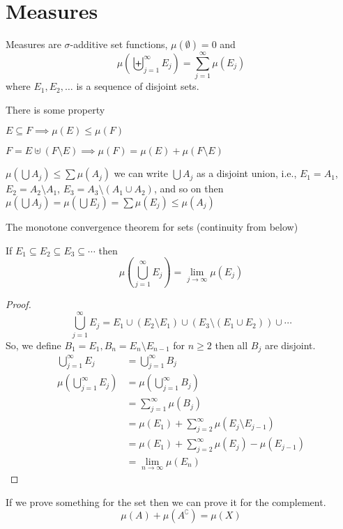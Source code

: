 \section{Measures}

\begin{definition}
Measures are $\sigma$-additive set functions, $\mu(\emptyset) = 0$ and
\[\mu\left(\biguplus_{j=1}^\infty E_j\right) = \sum_{j=1}^\infty \mu(E_j)\]
where $E_1, E_2, \dotsc$ is a sequence of disjoint sets.
\end{definition}

\begin{remark}
There is some property   

$E \subseteq F \implies \mu(E) \leq \mu(F)$ 

$F = E \uplus (F \setminus E) \implies \mu(F) = \mu(E) + \mu(F \setminus E)$

$\mu(\bigcup A_j) \leq \sum \mu(A_j)$
we can write $\bigcup A_j$ as a disjoint union, i.e.,
$E_1 = A_1$, $E_2 = A_2 \setminus A_1$, $E_3 = A_3 \setminus (A_1 \cup A_2)$, and so on then
$\mu(\bigcup A_j) = \mu(\bigcup E_j) = \sum \mu(E_j) \leq \mu(A_j)$
\end{remark}

The monotone convergence theorem for sets (continuity from below)

\begin{theorem}\label{lem:continuity-from-below}
  
If $E_1 \subseteq E_2 \subseteq E_3 \subseteq \dotsm$ then
\[\mu\left(\bigcup_{j=1}^\infty E_j\right) = \lim_{j\to\infty} \mu(E_j)\]
\end{theorem}

\begin{proof}
$$\bigcup_{j=1}^\infty E_j = E_1 \cup (E_2 \setminus E_1) \cup (E_3 \setminus (E_1 \cup E_2)) \cup \dotsm$$
So, we define $B_1 = E_1, B_n = E_n \setminus E_{n-1}$ for $n \ge 2$ then all $B_j$ are disjoint.
\begin{align*}
  \bigcup_{j=1}^\infty E_j &= \bigcup_{j=1}^\infty B_j \\
  \mu\left(\bigcup_{j=1}^\infty E_j\right)&= \mu\left(\bigcup_{j=1}^\infty B_j\right) \\
  &= \sum_{j=1}^\infty \mu(B_j) \\
  &= \mu(E_1) + \sum_{j=2}^\infty \mu(E_j \setminus E_{j-1}) \\
  &= \mu(E_1) + \sum_{j=2}^\infty \mu(E_j) - \mu(E_{j-1}) \\
  &= \lim_{n\to\infty} \mu(E_n)
\end{align*}
\end{proof}
\begin{remark}
  If we prove something for the set then we can prove it for the complement.
  \[\mu(A) + \mu(A^\complement) = \mu(X)\]
\end{remark}


